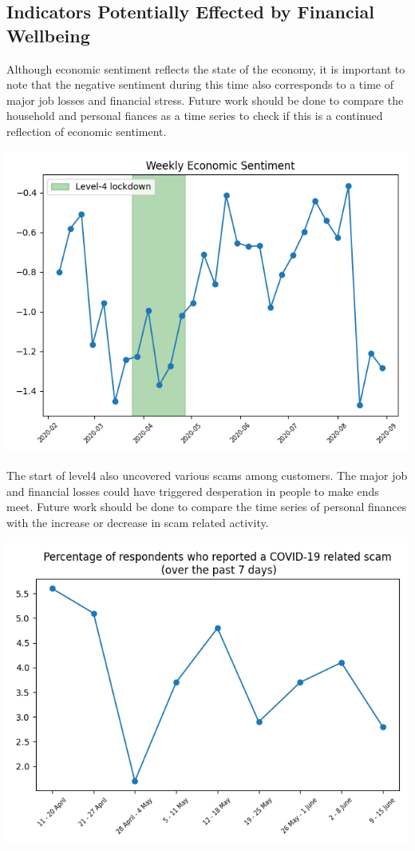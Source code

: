 \documentclass{article}
\begin{document}
\vspace{5cm}
\subsection*{Indicators Potentially Effected by Financial Wellbeing}

Although economic sentiment reflects the state of the economy, it is important to note that the negative sentiment during this time also corresponds to a time of major job losses and financial stress. Future work should be done to compare the household and personal fiances as a time series to check if this is a continued reflection of economic sentiment. 

\begin{center}
\includegraphics[scale=0.5]{plots/econ.png}
\end{center}

The start of level4 also uncovered various scams among customers. The major job and financial losses could have triggered desperation in people to make ends meet. Future work should be done to compare the time series of personal finances with the increase or decrease in scam related activity. 

\begin{center}
\includegraphics[scale=0.5]{plots/scam.png}
\end{center}
\end{document}
